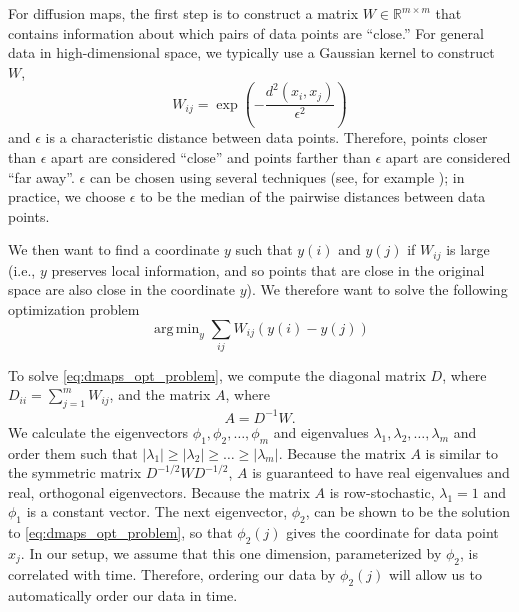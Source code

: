 \documentclass{pnastwo}
\DeclareMathOperator*{\argmin}{arg\,min}
\begin{document}
\begin{article}
\begin{materials}
For diffusion maps, the first step is to construct a matrix $W \in \mathbb{R}^{m \times m}$ that contains information about which pairs of data points are ``close.''
%
For general data in high-dimensional space, we typically use a Gaussian kernel to construct $W$,
\begin{equation} \label{eq:dmaps_W}
W_{ij} = \exp \left( -\frac{d^2(x_i, x_j)}{\epsilon^2} \right)
\end{equation}
and $\epsilon$ is a characteristic distance between data points.
%
Therefore, points closer than $\epsilon$ apart are considered ``close'' and points farther than $\epsilon$ apart are considered ``far away''.
%
$\epsilon$ can be chosen using several techniques (see, for example \cite{coifman2008graph}); in practice, we choose $\epsilon$ to be the median of the pairwise distances between data points.

We then want to find a coordinate $y$ such that $y(i)$ and $y(j)$ if $W_{ij}$ is large (i.e., $y$ preserves local information, and so points that are close in the original space are also close in the coordinate $y$).
%
We therefore want to solve the following optimization problem
\begin{equation} \label{eq:dmaps_opt_problem}
\argmin_{y} \sum_{ij} W_{ij} (y(i) - y(j))
\end{equation}
%

To solve \eqref{eq:dmaps_opt_problem}, we compute the diagonal matrix $D$, where $D_{ii} = \sum_{j=1}^{m} W_{ij}$, and the matrix $A$, where
\begin{equation} \label{eq:dmaps_A}
A = D^{-1} W.
\end{equation} 
%
We calculate the eigenvectors $\phi_1, \phi_2, \dots, \phi_m$ and eigenvalues $\lambda_1, \lambda_2, \dots, \lambda_m$ and order them such that $|\lambda_1| \ge |\lambda_2| \ge \dots \ge |\lambda_m|$.
%
Because the matrix $A$ is similar to the symmetric matrix $D^{-1/2} W D^{-1/2}$, $A$ is guaranteed to have real eigenvalues and real, orthogonal eigenvectors. 
%
Because the matrix $A$ is row-stochastic, $\lambda_1=1$ and $\phi_1$ is a constant vector.
%
%
The next eigenvector, $\phi_2$, can be shown to be the solution to \eqref{eq:dmaps_opt_problem}, so that $\phi_2(j)$ gives the coordinate for data point $x_j$.
%
In our setup, we assume that this one dimension, parameterized by $\phi_2$, is correlated with time.
%
Therefore, ordering our data by $\phi_2(j)$ will allow us to automatically order our data in time.


\end{materials}
\end{article}
\end{document}
